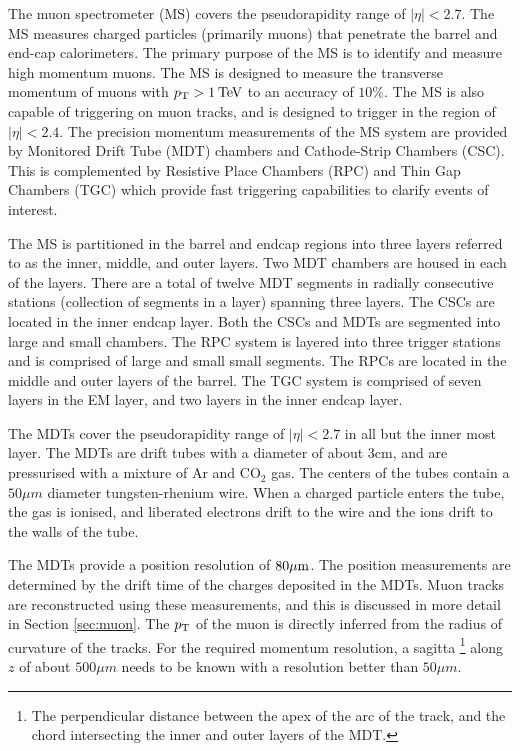 The muon spectrometer (MS) covers the pseudorapidity range of $|\eta|<2.7$. The MS measures charged particles (primarily muons) that penetrate the barrel and end-cap calorimeters. The primary purpose of the MS is to identify and measure high momentum muons. The MS is designed to measure the transverse momentum of muons with $p_{\text{T}}>1\hspace{2pt}\text{Te\kern -0.1em V}$ to an accuracy of $10\%$. The MS is also capable of triggering on muon tracks, and is designed to trigger in the region of $|\eta|<2.4$. The precision momentum measurements of the MS system are provided by Monitored Drift Tube (MDT) chambers and Cathode-Strip Chambers (CSC). This is complemented by Resistive Place Chambers (RPC) and Thin Gap Chambers (TGC) which provide fast triggering capabilities to clarify events of interest. 

The MS is partitioned in the barrel and endcap regions into three layers referred to as the inner, middle, and outer layers. Two MDT chambers are housed in each of the layers. There are a total of twelve MDT segments in radially consecutive stations (collection of segments in a layer) spanning three layers. The CSCs are located in the inner endcap layer. Both the CSCs and MDTs are segmented into large and small chambers. The RPC system is layered into three trigger stations and is comprised of large and small small segments. The RPCs are located in the middle and outer layers of the barrel. The TGC system is comprised of seven layers in the EM layer, and two layers in the inner endcap layer.

The MDTs cover the pseudorapidity range of $|\eta|<2.7$ in all but the inner most layer. The MDTs are drift tubes with a diameter of about 3cm, and are pressurised with a mixture of Ar and $\text{CO}_2$ gas. The centers of the tubes contain a $50\mu m$ diameter tungsten-rhenium wire. When a charged particle enters the tube, the gas is ionised, and liberated electrons drift to the wire and the ions drift to the walls of the tube. 

The MDTs provide a position resolution of $80\mu\text{m}$. The position measurements are determined by the drift time of the charges deposited in the MDTs. Muon tracks are reconstructed using these measurements, and this is discussed in more detail in Section \ref{sec:muon}. The $p_{\text{T}}$ of the muon is directly inferred from the radius of curvature of the tracks. For the required momentum resolution, a sagitta \footnote{The perpendicular distance between the apex of the arc of the track, and the chord intersecting the inner and outer layers of the MDT.} along $z$ of about $500\mu m$ needs to be known with a resolution better than $50\mu m$.  

